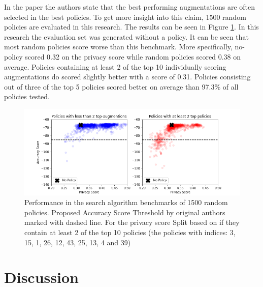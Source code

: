 In the paper the authors state that the best performing augmentations are often selected in the best policies. To get more insight into this claim, 1500 random policies are evaluated in this research. The results can be seen in Figure \ref{fig:bunch_a_policies}. In this research the evaluation set was generated without a policy. It can be seen that most random policies score worse than this benchmark. More specifically, no-policy scored 0.32 on the privacy score while random policies scored 0.38 on average. Policies containing at least 2 of the top 10 individually scoring augmentations do scored slightly better with a score of 0.31. Policies consisting out of three of the top 5 policies scored better on average than 97.3\% of all policies tested.

\begin{figure}[htp]
    \centering
    \includegraphics[width=12cm]{pics/policy_comparison.png}
    \caption{Performance in the search algorithm benchmarks of 1500 random policies. Proposed Accuracy Score Threshold by original authors marked with dashed line. For the privacy score Split based on if they contain at least 2 of the top 10 policies (the policies with indices: 3, 15, 1, 26, 12, 43, 25, 13, 4 and 39)}
    \label{fig:bunch_a_policies}
\end{figure}

\newpage


\section{Discussion}\label{sec:discuss}

